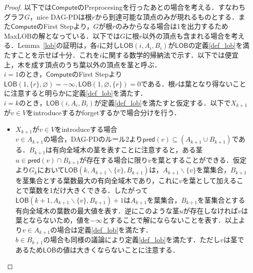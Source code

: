 \documentclass[master]{kuisthesis}		%
\theoremstyle{plain}
\theoremstyle{definition}
\begin{document}
\begin{proof}
    以下では$\mathsf{Compute}$のPreprocesingを行ったあとの場合を考える．すなわちグラフ$G$，nice DAG-PDは根$r$から到達可能な頂点のみが現れるものとする．また$\mathsf{Compute}$のFirst Stepより，$G$が根$r$のみからなる場合は1を出力するためMaxLOBの解となっている．以下では$G$に根$r$以外の頂点も含まれる場合を考える．Lemma~\ref{lob}の証明は，各$i$に対し$\mathsf{LOB}(i, A_i, B_i)$が$\mathsf{LOB}$の定義\ref{def_lob}を満たすことを示せば十分．これを$i$に関する数学的帰納法で示す．以下では便宜上，木を成す頂点のうち葉以外の頂点を茎と呼ぶ．\\
    $i=1$のとき，$\mathsf{Compute}$のFirst Stepより$\mathsf{LOB}(1, \{r\}, \varnothing) = -\infty, \mathsf{LOB}(1, \varnothing, \{r\}) = 0$である．根$r$は葉となり得ないことに注意すると明らかに定義\ref{def_lob}を満たす．\\
    $i=k$のとき，$\mathsf{LOB}(i, A_i, B_i)$が定義\ref{def_lob}を満たすと仮定する．以下で$X_{k+1}$が$v \in V$をintroduceするかforgetするかで場合分けを行う．
    \begin{itemize}
        \item $X_{k+1}$が$v \in V$をintroduceする場合 \\
        $v \in A_{k+1}$の場合，DAG-PDのルール2より$\mathsf{pred}(v) \subseteq (A_{k+1} \cup B_{k+1})$である．$B_{k+1}$は有向全域木の茎を表すことに注意すると，ある茎$u \in \mathsf{pred}(v) \cap B_{k+1}$が存在する場合に限り$v$を葉とすることができる．仮定より$G_k$において$\mathsf{LOB}(k, A_{k+1} \backslash \{v\}, B_{k+1})$は，$A_{k+1} \backslash \{v\}$を葉集合，$B_{k+1}$を茎集合とする葉数最大の有向全域木であり，これに$v$を葉として加えることで葉数を1だけ大きくできる．したがって$\mathsf{LOB}(k+1, A_{k+1} \backslash \{v\}, B_{k+1})+1$は$A_{k+1}$を葉集合，$B_{k+1}$を茎集合とする有向全域木の葉数の最大値を表す．逆にこのような茎$u$が存在しなければ$v$は葉とならないため，値を$-\infty$とすることで解にならないことを表す．以上より$v \in A_{k+1}$の場合は定義\ref{def_lob}を満たす．\\
        $b \in B_{k+1}$の場合も同様の議論により定義\ref{def_lob}を満たす．ただし$v$は茎であるため$\mathsf{LOB}$の値は大きくならないことに注意する．


\end{itemize}
\end{proof}
\end{document}
